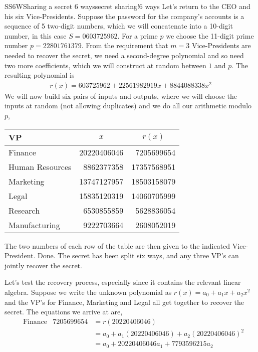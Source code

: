 \begin{example}{SS6W}{Sharing a secret 6 ways}{secret sharing!6 ways}
%
Let's return to the CEO and his six Vice-Presidents.  Suppose the password for the company's accounts is a sequence of 5 two-digit numbers, which we will concatenate into a 10-digit number, in this case $S= 0603725962$.  For a prime $p$ we choose the 11-digit prime number $p=22801761379$.  From the requirement that $m=3$ Vice-Presidents are needed to recover the secret, we need a second-degree polynomial and so need two more coefficients, which we will construct at random between $1$ and $p$.  The resulting polynomial is 
%
\begin{align*}
r(x)=603725962 + 22561982919 x + 8844088338 x^2
\end{align*}
%
We will now build six pairs of inputs and outputs, where we will choose the inputs at random (not allowing duplicates) and we do all our arithmetic modulo $p$,
%
\begin{center}
\begin{tabular}{lrr}
VP&\multicolumn{1}{c}{$x$}&\multicolumn{1}{c}{$r(x)$}\\\hline
 Finance                  & 20220406046 & 7205699654 \\
 Human Resources   & 8862377358   & 17357568951 \\
 Marketing               & 13747127957 & 18503158079 \\
 Legal                      & 15835120319 & 14060705999 \\
 Research                & 6530855859   & 5628836054 \\
 Manufacturing         & 9222703664   & 2608052019
\end{tabular}
\end{center}
%
The two numbers of each row of the table are then given to the indicated Vice-President.  Done.  The secret has been split six ways, and any three VP's can jointly recover the secret.\par
%
Let's test the recovery process, especially since it contains the relevant linear algebra.  Suppose we write the unknown polynomial as $r(x)=a_0+a_1x +a_2x^2$ and the VP's for Finance, Marketing and Legal all get together to recover the secret.  The equations we arrive at are,
%
\begin{align*}
&\text{Finance}
&
7205699654
&=r(20220406046)\\ 
&&&= a_0 + a_1(20220406046) + a_2(20220406046)^2\\ 
&&&= a_0 + 20220406046 a_1 + 7793596215 a_2\\

\end{align*}
\end{example}
